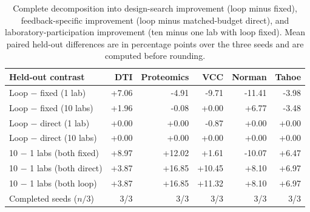 \begin{table}[t]
\caption{Complete decomposition into design-search improvement (loop minus fixed), feedback-specific improvement (loop minus matched-budget direct), and laboratory-participation improvement (ten minus one lab with loop fixed). Mean paired held-out differences are in percentage points over the three seeds and are computed before rounding.}
\label{tab:strong-effects-full}
\centering\small
\setlength{\tabcolsep}{3pt}
\begin{tabular}{lrrrrr}
\toprule
Held-out contrast & DTI & Proteomics & VCC & Norman & Tahoe \\
\midrule
Loop $-$ fixed (1 lab) & +7.06 & -4.91 & -9.71 & -11.41 & -3.98 \\
Loop $-$ fixed (10 labs) & +1.96 & -0.08 & +0.00 & +6.77 & -3.48 \\
Loop $-$ direct (1 lab) & +0.00 & +0.00 & -0.87 & +0.00 & +0.00 \\
Loop $-$ direct (10 labs) & +0.00 & +0.00 & +0.00 & +0.00 & +0.00 \\
10 $-$ 1 labs (both fixed) & +8.97 & +12.02 & +1.61 & -10.07 & +6.47 \\
10 $-$ 1 labs (both direct) & +3.87 & +16.85 & +10.45 & +8.10 & +6.97 \\
10 $-$ 1 labs (both loop) & +3.87 & +16.85 & +11.32 & +8.10 & +6.97 \\
\midrule
Completed seeds ($n/3$) & 3/3 & 3/3 & 3/3 & 3/3 & 3/3 \\
\bottomrule
\end{tabular}
\caption{Complete decomposition into design-search improvement (loop minus fixed), feedback-specific improvement (loop minus matched-budget direct), and laboratory-participation improvement (ten minus one lab with loop fixed). Mean paired held-out differences are in percentage points over the three seeds and are computed before rounding.}
\label{tab:strong-effects-full}
\end{table}
